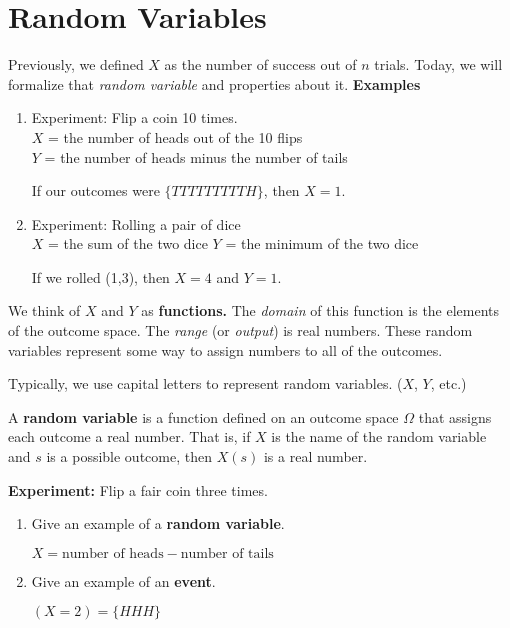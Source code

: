 \documentclass[titlepage, 12pt, leqno]{article}
\begin{document}
\pagebreak
\section{Random Variables}
Previously, we defined $X$ as the number of success out of $n$ trials. Today, we
will formalize that \textit{random variable} and properties about it.
\textbf{Examples} 
\begin{enumerate}
    \item Experiment: Flip a coin 10 times.\\[.1in]
        $X$ = the number of heads out of the 10 flips\\
        $Y$ = the number of heads minus the number of tails

        If our outcomes were $\{TTTTTTTTTH\}$, then $X=1$.

    \item Experiment: Rolling a pair of dice \\[.1in]
        $X$ = the sum of the two dice
        $Y$ = the minimum of the two dice

        If we rolled (1,3), then $X=4$ and $Y=1$.
\end{enumerate}

We think of $X$ and $Y$ as \textbf{functions.} The \textit{domain} of this 
function is the elements of the outcome space. The \textit{range} (or
\textit{output}) is real numbers. These random variables represent some way to
assign numbers to all of the outcomes.
\begin{note}
    Typically, we use capital letters to represent random variables. ($X$, $Y$, 
    etc.)
\end{note}

\begin{definition}
    A \textbf{random variable} is a function defined on an outcome space 
    $\Omega $ that assigns each outcome a real number. That is, if $X$ is the
    name of the random variable and $s$ is a possible outcome, then $X(s)$ is a
    real number.
\end{definition}

\textbf{Experiment:} Flip a fair coin three times.
\begin{enumerate}
    \item Give an example of a \textbf{random variable}.

        $\boxed{X = \text{number of heads} - \text{number of tails}}$
    \item Give an example of an \textbf{event}.

        $\boxed{(X = 2) = \{HHH\}}$
\end{enumerate}
\end{document}
